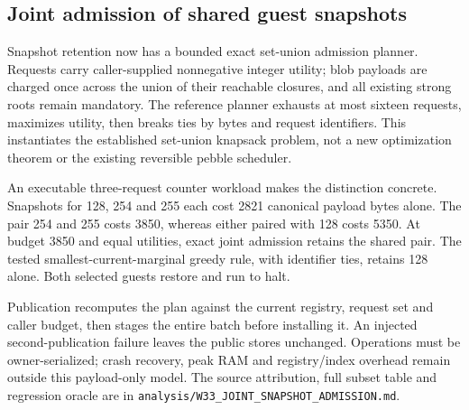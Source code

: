 \subsection{Joint admission of shared guest snapshots}
\label{subsec:joint-snapshot-admission}
Snapshot retention now has a bounded exact set-union admission planner.
Requests carry caller-supplied nonnegative integer utility; blob payloads are
charged once across the union of their reachable closures, and all existing
strong roots remain mandatory. The reference planner exhausts at most sixteen
requests, maximizes utility, then breaks ties by bytes and request identifiers.
This instantiates the established set-union knapsack problem, not a new
optimization theorem or the existing reversible pebble scheduler.

An executable three-request counter workload makes the distinction concrete.
Snapshots for 128, 254 and 255 each cost 2821 canonical payload bytes alone.
The pair 254 and 255 costs 3850, whereas either paired with 128 costs 5350.
At budget 3850 and equal utilities, exact joint admission retains the shared
pair. The tested smallest-current-marginal greedy rule, with identifier ties,
retains 128 alone. Both selected guests restore and run to halt.

Publication recomputes the plan against the current registry, request set and
caller budget, then stages the entire batch before installing it. An injected
second-publication failure leaves the public stores unchanged. Operations
must be owner-serialized; crash recovery, peak RAM and registry/index overhead
remain outside this payload-only model. The source attribution, full subset
table and regression oracle are in
\texttt{analysis/W33\_JOINT\_SNAPSHOT\_ADMISSION.md}.
